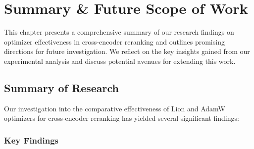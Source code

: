 
\chapter{Summary \& Future Scope of Work}
\label{Chapter6}

This chapter presents a comprehensive summary of our research findings on optimizer effectiveness in cross-encoder reranking and outlines promising directions for future investigation. We reflect on the key insights gained from our experimental analysis and discuss potential avenues for extending this work.

\section{Summary of Research}

Our investigation into the comparative effectiveness of Lion and AdamW optimizers for cross-encoder reranking has yielded several significant findings:

\subsection{Key Findings}

